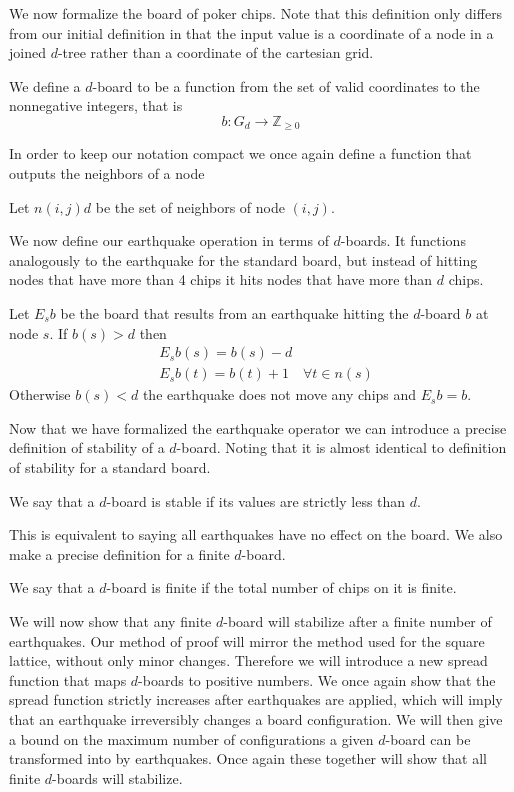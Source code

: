 \documentclass[runningheads,a4paper]{llncs}
\begin{document}
We now formalize the board of poker chips. Note that this definition only differs from our initial definition in that the input value is a coordinate of a node in a joined $d$-tree rather than a coordinate of the cartesian grid.
\begin{definition}
We define a $d$-board to be a function from the set of valid coordinates to the nonnegative integers, that is 
\begin{equation*}
b:  G_d \rightarrow \mathbb{Z}_{\geq 0}
\end{equation*}
\end{definition}

In order to keep our notation compact we once again define a function that outputs the neighbors of a node
\begin{definition} 
Let $n(i,j)d$ be the set of neighbors of node $(i,j)$.
\end{definition}

We now define our earthquake operation in terms of $d$-boards. It functions analogously to the earthquake for the standard board, but instead of hitting nodes that have more than 4 chips it hits nodes that have more than $d$ chips. 
\begin{definition}
Let $E_s b$ be the board that results from an earthquake hitting the $d$-board $b$ at node $s$. If $b(s)>d$ then 
\begin{align*}
&E_s b(s) = b(s)- d \\
&E_s b(t) = b(t) +1 \quad \forall t \in n(s)
\end{align*}
Otherwise $b(s)<d$ the earthquake does not move any chips and $E_s b=b$.
\end{definition}

Now that we have formalized the earthquake operator we can introduce a precise definition of stability of a $d$-board. Noting that it is almost identical to definition of stability for a standard board. 
\begin{definition}
We say that a $d$-board is stable if its values are strictly less than $d$.
\end{definition}
This is equivalent to saying all earthquakes have no effect on the board. We also make a precise definition for a finite $d$-board.
\begin{definition} 
We say that a $d$-board is finite if the total number of chips on it is finite.
\end{definition}

We will now show that any finite $d$-board will stabilize after a finite number of earthquakes. Our method of proof will mirror the method used for the square lattice, without only minor changes.  Therefore we will introduce a new spread function that maps $d$-boards to positive numbers. We once again show that the spread function strictly increases after earthquakes are applied, which will imply that an earthquake irreversibly changes a board configuration. We will then give a bound on the maximum number of configurations a given $d$-board can be transformed into by earthquakes. Once again these together will show that all finite $d$-boards will stabilize.
\end{document}
